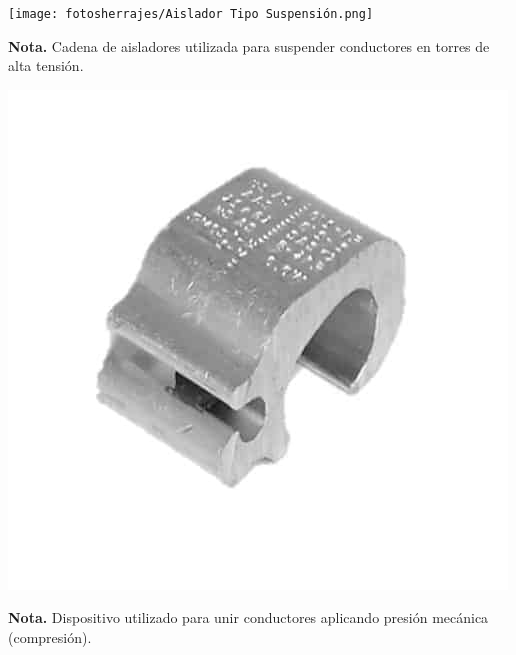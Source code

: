 \noindent %
\begin{minipage}[t]{0.48\textwidth} %
    \centering
    \texttt{[image: fotosherrajes/Aislador Tipo Suspensión.png]}
    \footnotesize
    \raggedright
    \textbf{Nota.} Cadena de aisladores utilizada para suspender conductores en torres de alta tensión.
\end{minipage}%
\hfill%
\begin{minipage}[t]{0.48\textwidth} %
    \centering
    \includegraphics[width=\linewidth]{fotosherrajes/conector de compresion.jpg}
    \footnotesize
    \raggedright
    \textbf{Nota.} Dispositivo utilizado para unir conductores aplicando presión mecánica (compresión).
\end{minipage}

\vspace{1cm} %

